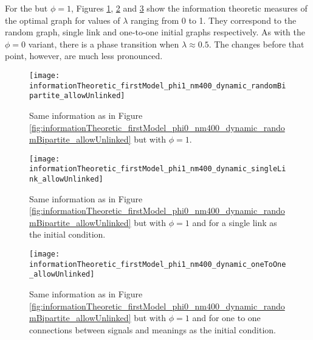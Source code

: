 


For the \firstmodel{} but $\phi=1$, Figures  \ref{fig:informationTheoretic_firstModel_phi1_nm400_dynamic_randomBipartite_allowUnlinked},  \ref{fig:informationTheoretic_firstModel_phi1_nm400_dynamic_singleLink_allowUnlinked} and  \ref{fig:informationTheoretic_firstModel_phi1_nm400_dynamic_oneToOne_allowUnlinked} show the information theoretic measures of the optimal graph for values of $\lambda$ ranging from 0 to 1.
They correspond to the random graph, single link and one-to-one initial graphs respectively.
As with the $\phi=0$ variant, there is a phase transition when $\lambda \approx 0.
5$.
The changes before that point, however, are much less pronounced.

\begin{figure}
  \centering
  \texttt{[image: informationTheoretic\_firstModel\_phi1\_nm400\_dynamic\_randomBipartite\_allowUnlinked]}
  \caption{Same information as in Figure \ref{fig:informationTheoretic_firstModel_phi0_nm400_dynamic_randomBipartite_allowUnlinked} but with $\phi=1$.}
  \label{fig:informationTheoretic_firstModel_phi1_nm400_dynamic_randomBipartite_allowUnlinked}
\end{figure}

\begin{figure}
  \centering
  \texttt{[image: informationTheoretic\_firstModel\_phi1\_nm400\_dynamic\_singleLink\_allowUnlinked]}
  \caption{Same information as in Figure \ref{fig:informationTheoretic_firstModel_phi0_nm400_dynamic_randomBipartite_allowUnlinked} but with $\phi=1$ and for a single link as the initial condition.}
  \label{fig:informationTheoretic_firstModel_phi1_nm400_dynamic_singleLink_allowUnlinked}
\end{figure}

\begin{figure}
  \centering
  \texttt{[image: informationTheoretic\_firstModel\_phi1\_nm400\_dynamic\_oneToOne\_allowUnlinked]}
  \caption{Same information as in Figure \ref{fig:informationTheoretic_firstModel_phi0_nm400_dynamic_randomBipartite_allowUnlinked} but with $\phi=1$ and for one to one connections between signals and meanings as the initial condition.}
  \label{fig:informationTheoretic_firstModel_phi1_nm400_dynamic_oneToOne_allowUnlinked}
\end{figure}

